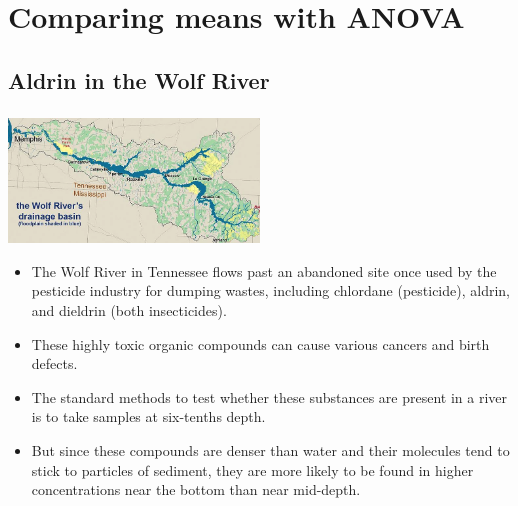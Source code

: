 
\section{Comparing means with ANOVA}


\subsection{Aldrin in the Wolf River}


\begin{frame}
\frametitle{}

\begin{center}
\includegraphics[width=0.5\textwidth]{7-5_anova/figures/aldrin/wolf}
\end{center}

{\small
\begin{itemize}

\item  The Wolf River in Tennessee flows past an abandoned site once used by the pesticide industry for dumping wastes, including chlordane (pesticide), aldrin, and dieldrin (both insecticides).

\pause

\item These highly toxic organic compounds can cause various cancers and birth defects.

\pause

\item The standard methods to test whether these substances are present in a river is to take samples at six-tenths depth. 

\pause

\item But since these compounds are denser than water and their molecules tend to stick to particles of sediment, they are more likely to be found in higher concentrations near the bottom than near mid-depth.

\end{itemize}
}

\end{frame}

